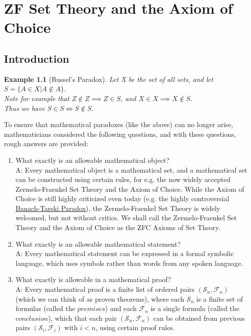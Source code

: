 \documentclass[11pt, oneside]{book}
\theoremstyle{break}
\newtheorem{eg}{Example}[section]
\begin{document}
\appendix

\chapter{ZF Set Theory and the Axiom of Choice}\label{apdxA}
\section{Introduction}
\begin{eg}[Russel's Paradox]\label{russel_paradox}
	Let X be the set of all sets, and let $S = \{ A \in X | A \notin A\}$.\\
	Note for example that $Z \notin Z \implies Z \in S$, and $X \in X \implies X \notin S$.\\
	Thus we have $S \in S \iff S \notin S$.
\end{eg}

To ensure that mathematical paradoxes (like the above) can no longer arise, mathematicians considered the following questions, and with these questions, rough answers are provided:
\begin{enumerate}
	\item What exactly is an allowable mathematical object? \\
	A: Every mathematical object is a mathematical set, and a mathematical set can be constructed using certain rules, for e.g. the now widely accepted Zermelo-Fraenkel Set Theory and the Axiom of Choice. While the Axiom of Choice is still highly criticized even today (e.g. the highly controversial \href{https://en.wikipedia.org/wiki/Banach–Tarski_paradox}{Banach-Tarski Paradox}), the Zermelo-Fraenkel Set Theory is widely welcomed, but not without critics. We shall call the Zermelo-Fraenkel Set Theory and the Axiom of Choice as the ZFC Axioms of Set Theory.
	\item What exactly is an allowable mathematical statement? \\
	A: Every mathematical statement can be expressed in a formal symbolic language, which uses symbols rather than words from any spoken language.
	\item What exactly is allowable in a mathematical proof? \\
	A: Every mathematical proof is a finite list of ordered pairs $(\mathscr{S}_n, \mathscr{F}_n)$ (which we can think of as proven theorems), where each $\mathscr{S}_n$ is a finite set of formulas (called the $\textit{premises}$) and each $\mathscr{F}_n$ is a single formula (called the $\textit{conclusion}$), which that each pair $(\mathscr{S}_n, \mathscr{F}_n)$ can be obtained from previous pairs $(\mathscr{S}_i, \mathscr{F}_i)$ with $i < n$, using certain proof rules.
\end{enumerate}
\end{document}
